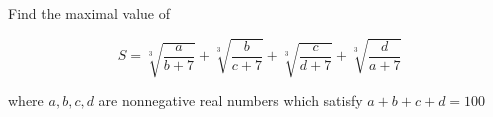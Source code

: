 Find the maximal value of

$$S = \sqrt[3]{\frac{a}{b+7}} + \sqrt[3]{\frac{b}{c+7}} + \sqrt[3]{\frac{c}{d+7}} + \sqrt[3]{\frac{d}{a+7}}$$

where $a, b, c, d$ are nonnegative real numbers which satisfy $a + b + c + d = 100$
